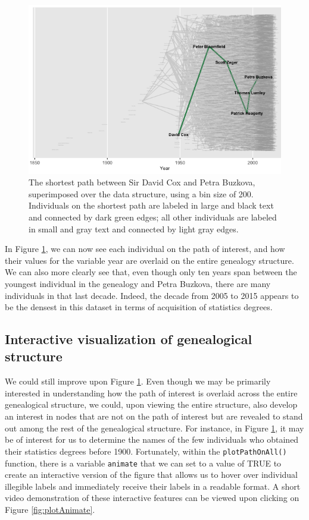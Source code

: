 \documentclass[11pt,a4paper,oldfontcommands,openany]{memoir}
\numberwithin{equation}{section} %
\newcommand{\code}[1]{{\texttt{#1}}}
\begin{document}
\begin{figure}[H]
    \centering
    \includegraphics[width=\textwidth]{plotCBNoText}
    \caption{The shortest path between Sir David Cox and Petra Buzkova, superimposed over the data structure, using a bin size of 200. Individuals on the shortest path are labeled in large and black text and connected by dark green edges; all other individuals are labeled in small and gray text and connected by light gray edges.}
    \label{fig:plotCBNoText}
\end{figure}

In Figure \ref{fig:plotCBNoText}, we can now see each individual on the path of interest, and how their values for the variable year are overlaid on the entire genealogy structure. We can also more clearly see that, even though only ten years span between the youngest individual in the genealogy and Petra Buzkova, there are many individuals in that last decade. Indeed, the decade from 2005 to 2015 appears to be the densest in this dataset in terms of acquisition of statistics degrees.

\subsection{Interactive visualization of genealogical structure}

We could still improve upon Figure \ref{fig:plotCBNoText}. Even though we may be primarily interested in understanding how the path of interest is overlaid across the entire genealogical structure, we could, upon viewing the entire structure, also develop an interest in nodes that are not on the path of interest but are revealed to stand out among the rest of the genealogical structure. For instance, in Figure \ref{fig:plotCBNoText}, it may be of interest for us to determine the names of the few individuals who obtained their statistics degrees before 1900. Fortunately, within the \code{plotPathOnAll()} function, there is a variable \code{animate} that we can set to a value of TRUE to create an interactive version of the figure that allows us to hover over individual illegible labels and immediately receive their labels in a readable format. A short video demonstration of these interactive features can be viewed upon clicking on Figure \ref{fig:plotAnimate}.
\end{document}
